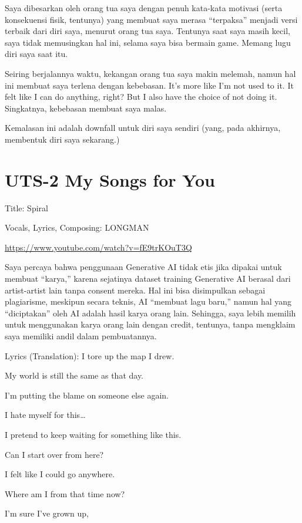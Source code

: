 \documentclass[
  letterpaper,
  DIV=11,
  numbers=noendperiod]{scrreprt}
\begin{document}
Saya dibesarkan oleh orang tua saya dengan penuh kata-kata motivasi
(serta konsekuensi fisik, tentunya) yang membuat saya merasa
``terpaksa'' menjadi versi terbaik dari diri saya, menurut orang tua
saya. Tentunya saat saya masih kecil, saya tidak memusingkan hal ini,
selama saya bisa bermain game. Memang lugu diri saya saat itu.

Seiring berjalannya waktu, kekangan orang tua saya makin melemah, namun
hal ini membuat saya terlena dengan kebebasan. It's more like I'm not
used to it. It felt like I can do anything, right? But I also have the
choice of not doing it. Singkatnya, kebebasan membuat saya malas.

Kemalasan ini adalah downfall untuk diri saya sendiri (yang, pada
akhirnya, membentuk diri saya sekarang.)


\chapter{UTS-2 My Songs for You}\label{uts-2-my-songs-for-you}

Title: Spiral

Vocals, Lyrics, Composing: LONGMAN

\url{https://www.youtube.com/watch?v=fE9trKOuT3Q}

Saya percaya bahwa penggunaan Generative AI tidak etis jika dipakai
untuk membuat ``karya,'' karena sejatinya dataset training Generative AI
berasal dari artist-artist lain tanpa consent mereka. Hal ini bisa
disimpulkan sebagai plagiarisme, meskipun secara teknis, AI ``membuat
lagu baru,'' namun hal yang ``diciptakan'' oleh AI adalah hasil karya
orang lain. Sehingga, saya lebih memilih untuk menggunakan karya orang
lain dengan credit, tentunya, tanpa mengklaim saya memiliki andil dalam
pembuatannya.

Lyrics (Translation): I tore up the map I drew.

My world is still the same as that day.

I'm putting the blame on someone else again.

I hate myself for this\ldots{}

I pretend to keep waiting for something like this.

Can I start over from here?

I felt like I could go anywhere.

Where am I from that time now?

I'm sure I've grown up,
\end{document}
